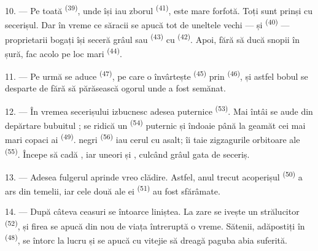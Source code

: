 10. --- Pe toată  \textsuperscript{(39)}, unde își iau zborul
 \textsuperscript{(41)}, este mare forfotă. Toți sunt prinși cu
secerișul. Dar în vreme ce săracii se apucă tot de uneltele vechi ---
 și  \textsuperscript{(40)} --- proprietarii
bogați își seceră grâul sau  \textsuperscript{(43)} cu
 \textsuperscript{(42)}. Apoi, fără să ducă snopii în șură,
fac acolo pe loc  mari \textsuperscript{(44)}.

11. --- Pe urmă se aduce  \textsuperscript{(47)}, pe care o
învârtește  \textsuperscript{(45)} prin  \textsuperscript{(46)}, și astfel bobul se desparte de 
fără să părăsească ogorul unde a fost semănat.

\VUsaut{5.0mm}
\VUsaut{3.4mm}

12. --- În vremea secerișului izbucnesc adesea  puternice
\textsuperscript{(53)}. Mai întâi se aude din depărtare bubuitul ;
se ridică un  \textsuperscript{(54)} puternic și îndoaie până
la geamăt cei mai mari copaci ai  \textsuperscript{(49)}.
 negri \textsuperscript{(56)} iau cerul cu asalt; îi taie zigzagurile
orbitoare ale  \textsuperscript{(55)}. Începe să cadă
, iar uneori și , culcând grâul gata de seceriș.

13. --- Adesea fulgerul aprinde vreo clădire. Astfel, anul trecut acoperișul
 \textsuperscript{(50)} a ars din temelii, iar cele două
 ale ei \textsuperscript{(51)} au fost sfărâmate.

14. --- După câteva ceasuri se întoarce liniștea. La zare se ivește un
 strălucitor \textsuperscript{(52)}, și firea se apucă din nou de
viața întreruptă o vreme. Sătenii, adăpostiți în 
\textsuperscript{(48)}, se întorc la lucru și se apucă cu vitejie să dreagă paguba
abia suferită.

\VUsaut{6.0mm}
\VUsaut{3.6mm}

\VUsaut{1.4mm}
\VUsaut{4.0mm}

